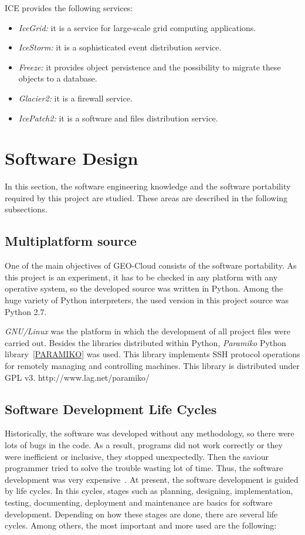\ac{ICE} provides the following services:
\begin{itemize}
\item \emph{IceGrid:} it is a service for large-scale grid computing applications.
\item \emph{IceStorm:} it is a sophisticated event distribution service.
\item \emph{Freeze:} it provides object persistence and the possibility to migrate
  these objects to a database.
\item \emph{Glacier2:} it is a firewall service.
\item \emph{IcePatch2:} it is a software and files distribution service.
\end{itemize}

\section{Software Design}

In this section, the software engineering knowledge and the software portability required by this project are studied. These areas are
described in the following subsections.

\subsection{Multiplatform source}

One of the main objectives of GEO-Cloud consists of the software portability. As
this project is an experiment, it has to be checked in any platform with any
operative system, so the developed source was written in Python. Among the huge variety of Python
interpreters, the used version in this project source was Python 2.7.

\emph{GNU/Linux} was the platform in which the development of all project files were
carried out. Besides the libraries distributed within Python, \emph{Paramiko}
Python library~\ref{PARAMIKO} was used. This library implements \ac{SSH} protocol operations
for remotely managing and controlling machines. This library is distributed
under \ac{GPL} v3.
http://www.lag.net/paramiko/

\subsection{Software Development Life Cycles}

Historically, the software
was developed without any methodology, so there were lots of bugs in the
code. As a result, programs did not work correctly or they were inefficient or
inclusive, they stopped unexpectedly. Then the saviour programmer tried to solve
the trouble wasting lot of time. Thus, the software development was very
expensive~\cite{MIRARPIATTINI}.
At present, the software development is guided by life cycles. In this cycles,
stages such as planning, designing, implementation, testing, documenting, deployment
and maintenance are basics for software development. Depending on how these
stages are done, there are several life cycles. Among others, the most important and
more used are the following:


